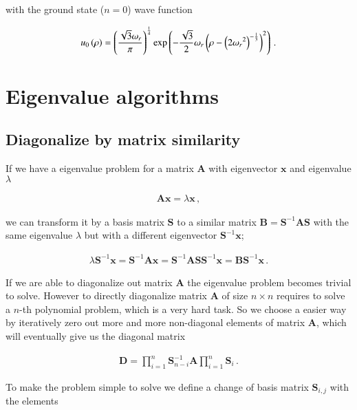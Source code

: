 \documentclass[11pt,english,a4paper]{article}
\begin{document}
\begin{flushleft}
with the ground state ($n=0$) wave function

\begin{align}
u_0\left({\rho}\right) = \left({\frac{\sqrt{3}\omega_r}{\pi}}\right)^{\frac{1}{4}}\exp\left({-\frac{\sqrt{3}}{2}\omega_r\left({\rho-\left({2{\omega_r}^2}\right)^{-\frac{1}{3}}}\right)^2}\right) \,.
\label{eq_7}
\end{align}

\section{Eigenvalue algorithms}

\subsection{Diagonalize by matrix similarity}\label{sec_Diagonalize}

If we have a eigenvalue problem for a matrix $\textbf{A}$ with eigenvector $\mathbf{x}$ and eigenvalue $\lambda$

\begin{align*}
\mathbf{A}\mathbf{x} = \lambda \mathbf{x} \,,
\end{align*}

we can transform it by a basis matrix $\mathbf{S}$ to a similar matrix $\mathbf{B} = \mathbf{S}^{-1}\mathbf{A}\mathbf{S}$ with the same eigenvalue $\lambda$ but with a different eigenvector $\mathbf{S}^{-1} \mathbf{x}$;

\begin{align*}
\lambda \mathbf{S}^{-1} \mathbf{x} = \mathbf{S}^{-1}\mathbf{A}\mathbf{x} = \mathbf{S}^{-1}\mathbf{A}\mathbf{S} \mathbf{S}^{-1}\mathbf{x} = \mathbf{B}\mathbf{S}^{-1}\mathbf{x} \,.
\end{align*}

If we are able to diagonalize out matrix $\mathbf{A}$ the eigenvalue problem becomes trivial to solve. However to directly diagonalize matrix $\mathbf{A}$ of size $n\times n$ requires to solve a $n$-th polynomial problem, which is a very hard task. So we choose a easier way by iteratively zero out more and more non-diagonal elements of matrix $\mathbf{A}$, which will eventually give us the diagonal matrix

\begin{align*}
\mathbf{D} = \prod_{i=1}^n \mathbf{S}_{n-i}^{-1} \mathbf{A} \prod_{i=1}^n \mathbf{S}_i\,.
\end{align*}

To make the problem simple to solve we define a change of basis matrix $\textbf{S}_{i,j}$ with the elements


\end{flushleft}
\end{document}
